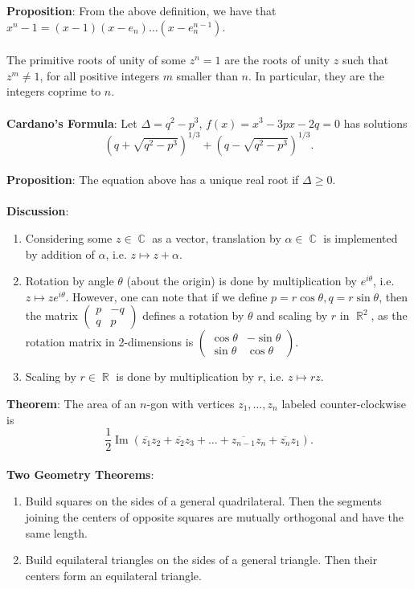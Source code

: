 \documentclass{article}
\DeclareMathOperator{\R}{\mathbb{R}}
\DeclareMathOperator{\C}{\mathbb{C}}
\DeclareMathOperator{\im}{Im}
\begin{document}
\textbf{Proposition}: From the above definition, we have that $x^n - 1 = (x - 1)(x - e_n)\dots(x - e_n^{n - 1})$. \\ \\
The primitive roots of unity of some $z^n = 1$ are the roots of unity $z$ such that $z^m \neq 1$, for all positive integers $m$ smaller than $n$. In particular, they are the integers coprime to $n$. \\ \\
\textbf{Cardano's Formula}: Let $\Delta = q^2 - p^3$, $f(x) = x^3 - 3px - 2q = 0$ has solutions $$(q + \sqrt{q^2 - p^3})^{1/3} + (q - \sqrt{q^2 - p^3})^{1/3}.$$ \\
\textbf{Proposition}: The equation above has a unique real root if $\Delta \geq 0$. \\ \\
\textbf{Discussion}: \begin{enumerate}
    \item Considering some $z \in \C$ as a vector, translation by $\alpha \in \C$ is implemented by addition of $\alpha$, i.e. $z \mapsto z + \alpha$. 
    \item Rotation by angle $\theta$ (about the origin) is done by multiplication by $e^{i\theta}$, i.e. $z \mapsto ze^{i\theta}$. However, one can note that if we define $p = r\cos\theta, q = r\sin\theta$, then the matrix $\begin{pmatrix}
        p & -q \\
        q & p
    \end{pmatrix}$ defines a rotation by $\theta$ and scaling by $r$ in $\R^2$, as the rotation matrix in 2-dimensions is $\begin{pmatrix}
        \cos\theta & -\sin\theta \\
        \sin\theta & \cos\theta
    \end{pmatrix}$.
    \item Scaling by $r \in \R$ is done by multiplication by $r$, i.e. $z \mapsto rz$.
\end{enumerate} $ $ \\
\textbf{Theorem}: The area of an $n$-gon with vertices $z_1, \dots, z_n$ labeled counter-clockwise is $$\frac{1}{2}\im(\overline{z_1}z_2 + \overline{z_2}z_3 + \dots + \overline{z_{n - 1}}z_n + \overline{z_n}z_1).$$ \\
\textbf{Two Geometry Theorems}: \begin{enumerate}
    \item Build squares on the sides of a general quadrilateral. Then the segments joining the centers of opposite squares are mutually orthogonal and have the same length.
    \item Build equilateral triangles on the sides of a general triangle. Then their centers form an equilateral triangle.
\end{enumerate} $ $ \\
\end{document}
